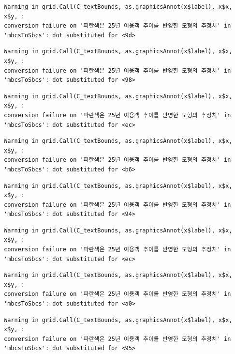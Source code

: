 \documentclass[
  letterpaper,
  DIV=11,
  numbers=noendperiod]{scrreprt}
\begin{document}
\begin{verbatim}
Warning in grid.Call(C_textBounds, as.graphicsAnnot(x$label), x$x, x$y, :
conversion failure on '파란색은 25년 이용객 추이를 반영한 모형의 추정치' in
'mbcsToSbcs': dot substituted for <9d>
\end{verbatim}

\begin{verbatim}
Warning in grid.Call(C_textBounds, as.graphicsAnnot(x$label), x$x, x$y, :
conversion failure on '파란색은 25년 이용객 추이를 반영한 모형의 추정치' in
'mbcsToSbcs': dot substituted for <98>
\end{verbatim}

\begin{verbatim}
Warning in grid.Call(C_textBounds, as.graphicsAnnot(x$label), x$x, x$y, :
conversion failure on '파란색은 25년 이용객 추이를 반영한 모형의 추정치' in
'mbcsToSbcs': dot substituted for <ec>
\end{verbatim}

\begin{verbatim}
Warning in grid.Call(C_textBounds, as.graphicsAnnot(x$label), x$x, x$y, :
conversion failure on '파란색은 25년 이용객 추이를 반영한 모형의 추정치' in
'mbcsToSbcs': dot substituted for <b6>
\end{verbatim}

\begin{verbatim}
Warning in grid.Call(C_textBounds, as.graphicsAnnot(x$label), x$x, x$y, :
conversion failure on '파란색은 25년 이용객 추이를 반영한 모형의 추정치' in
'mbcsToSbcs': dot substituted for <94>
\end{verbatim}

\begin{verbatim}
Warning in grid.Call(C_textBounds, as.graphicsAnnot(x$label), x$x, x$y, :
conversion failure on '파란색은 25년 이용객 추이를 반영한 모형의 추정치' in
'mbcsToSbcs': dot substituted for <ec>
\end{verbatim}

\begin{verbatim}
Warning in grid.Call(C_textBounds, as.graphicsAnnot(x$label), x$x, x$y, :
conversion failure on '파란색은 25년 이용객 추이를 반영한 모형의 추정치' in
'mbcsToSbcs': dot substituted for <a0>
\end{verbatim}

\begin{verbatim}
Warning in grid.Call(C_textBounds, as.graphicsAnnot(x$label), x$x, x$y, :
conversion failure on '파란색은 25년 이용객 추이를 반영한 모형의 추정치' in
'mbcsToSbcs': dot substituted for <95>
\end{verbatim}
\end{document}
